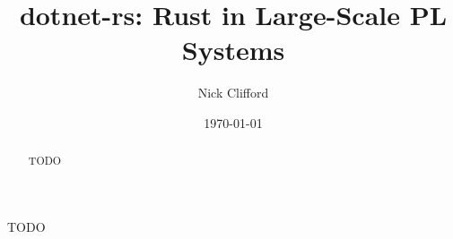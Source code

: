 \documentclass[12pt]{article}
\title{dotnet-rs: Rust in Large-Scale PL Systems}
\author{Nick Clifford}
\date{\today}
\begin{document}
    \maketitle

    \begin{abstract}
        TODO
    \end{abstract}
    
    TODO
\end{document}
